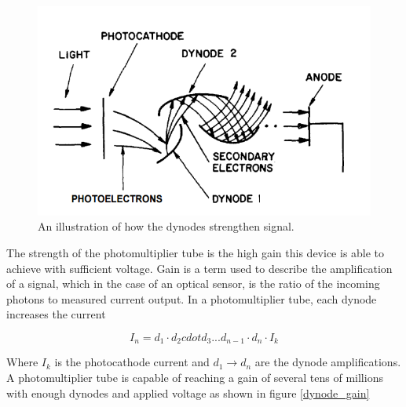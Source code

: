 \begin{figure}[htb]
\begin{center}
\includegraphics[scale=0.6]{figures/RCS/PMT}
\caption{An illustration of how the dynodes strengthen signal.}
\label{fig:PMT_dynode}
\end{center}
\end{figure}

The strength of the photomultiplier tube is the high gain this device is able to achieve with sufficient voltage. Gain is a term used to describe the amplification of a signal, which in the case of an optical sensor, is the ratio of the incoming photons to measured current output. In a photomultiplier tube, each dynode increases the current

\begin{equation}
    I_n = d_1 \cdot d_2 cdot d_3 ... d_{n-1} \cdot d_n \cdot I_k
\end{equation}

Where $I_k$ is the photocathode current and $d_1 \rightarrow d_n$ are the dynode amplifications. A photomultiplier  tube is capable of reaching a gain of several tens of millions with enough dynodes and applied voltage as shown in figure \ref{dynode_gain}\\


